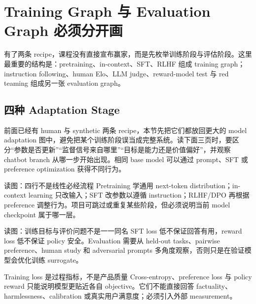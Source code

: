 \section{Training Graph 与 Evaluation Graph 必须分开画}

有了两条 recipe，课程没有直接宣布赢家，而是先枚举训练阶段与评估阶段。这里最重要的结构是：pretraining、in-context、SFT、RLHF 组成 training graph；instruction following、human Elo、LLM judge、reward-model test 与 red teaming 组成另一张 evaluation graph。

\subsection{四种 Adaptation Stage}

前面已经有 human 与 synthetic 两条 recipe，本节先把它们都放回更大的 model adaptation 图中，避免把某个训练阶段误当成完整系统。读下面三页时，要区分“参数是否更新”“监督信号来自哪里”“目标是能力还是价值偏好”，并观察 chatbot branch 从哪一步开始出现。相同 base model 可以通过 prompt、SFT 或 preference optimization 获得不同行为。


\begin{knowledgebox}{读图：四行不是线性必经流程}
Pretraining 学通用 next-token distribution；in-context learning 只改输入；SFT 改参数以遵循 instruction；RLHF/DPO 再根据 preference 调整行为。项目可跳过或重复某些阶段，但必须说明当前 model checkpoint 属于哪一层。
\end{knowledgebox}


\begin{knowledgebox}{读图：训练目标与评价问题不是一一同名}
SFT loss 低不保证回答有用，reward loss 低不保证 policy 安全。Evaluation 需要从 held-out tasks、pairwise preference、human study 和 adversarial prompts 多角度观察，否则只是在验证模型会优化训练 surrogate。
\end{knowledgebox}


\begin{importantbox}{Training loss 是过程指标，不是产品质量}
Cross-entropy、preference loss 与 policy reward 只能说明模型更贴近各自 objective。它们不能直接回答 factuality、harmlessness、calibration 或真实用户满意度；必须引入外部 measurement。
\end{importantbox}

